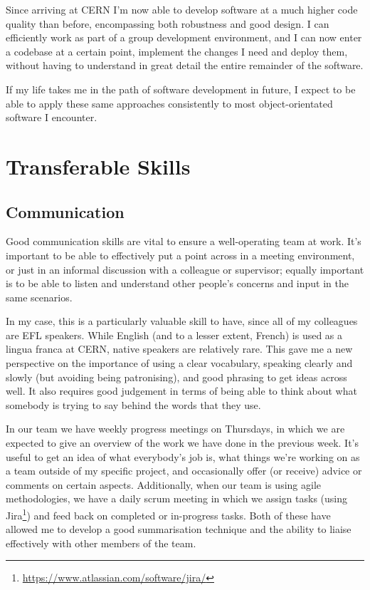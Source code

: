 \documentclass[a4paper,11pt]{article} %
\begin{document}
Since arriving at CERN I'm now able to develop software at a much higher code quality than before, encompassing both robustness and good design.  I can efficiently work as part of a group development environment, and I can now enter a codebase at a certain point, implement the changes I need and deploy them, without having to understand in great detail the entire remainder of the software.

If my life takes me in the path of software development in future, I expect to be able to apply these same approaches consistently to most object-orientated software I encounter.

\section{Transferable Skills}
\label{sec:transferable}

\subsection{Communication}
\label{sec:transferable.communication}
Good communication skills are vital to ensure a well-operating team at work.  It's important to be able to effectively put a point across in a meeting environment, or just in an informal discussion with a colleague or supervisor; equally important is to be able to listen and understand other people's concerns and input in the same scenarios.

In my case, this is a particularly valuable skill to have, since all of my colleagues are EFL speakers.  While English (and to a lesser extent, French) is used as a lingua franca at CERN, native speakers are relatively rare.  This gave me a new perspective on the importance of using a clear vocabulary, speaking clearly and slowly (but avoiding being patronising), and good phrasing to get ideas across well.  It also requires good judgement in terms of being able to think about what somebody is trying to say behind the words that they use.

In our team we have weekly progress meetings on Thursdays, in which we are expected to give an overview of the work we have done in the previous week.  It's useful to get an idea of what everybody's job is, what things we're working on as a team outside of my specific project, and occasionally offer (or receive) advice or comments on certain aspects.  Additionally, when our team is using agile methodologies, we have a daily scrum meeting in which we assign tasks (using Jira\footnote{\url{https://www.atlassian.com/software/jira/}}) and feed back on completed or in-progress tasks.  Both of these have allowed me to develop a good summarisation technique and the ability to liaise effectively with other members of the team.
\end{document}
